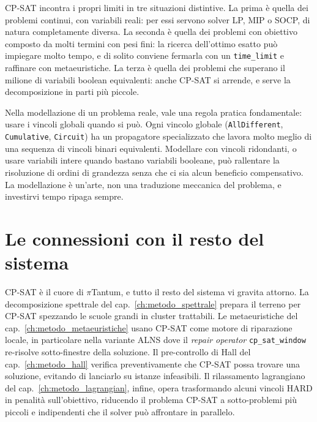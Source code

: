CP-SAT incontra i propri limiti in tre situazioni
distintive. La prima \`e quella dei problemi continui, con
variabili reali: per essi servono solver LP, MIP o SOCP, di
natura completamente diversa. La seconda \`e quella dei
problemi con obiettivo composto da molti termini con pesi
fini: la ricerca dell'ottimo esatto pu\`o impiegare molto
tempo, e di solito conviene fermarla con un \texttt{time\_limit}
e raffinare con metaeuristiche. La terza \`e quella dei
problemi che superano il milione di variabili boolean
equivalenti: anche CP-SAT si arrende, e serve la
decomposizione in parti pi\`u piccole.

\begin{avvertenzabox}
Nella modellazione di un problema reale, vale una regola
pratica fondamentale: usare i vincoli globali quando si pu\`o.
Ogni vincolo globale (\texttt{AllDifferent},
\texttt{Cumulative}, \texttt{Circuit}) ha un propagatore
specializzato che lavora molto meglio di una sequenza di
vincoli binari equivalenti. Modellare con vincoli ridondanti,
o usare variabili intere quando bastano variabili booleane,
pu\`o rallentare la risoluzione di ordini di grandezza
senza che ci sia alcun beneficio compensativo. La modellazione
\`e un'arte, non una traduzione meccanica del problema, e
investirvi tempo ripaga sempre.
\end{avvertenzabox}

\section{Le connessioni con il resto del sistema}

CP-SAT \`e il cuore di $\pi$Tantum, e tutto il resto del
sistema vi gravita attorno. La decomposizione spettrale del
cap.~\ref{ch:metodo_spettrale} prepara il terreno per CP-SAT
spezzando le scuole grandi in cluster trattabili. Le
metaeuristiche del cap.~\ref{ch:metodo_metaeuristiche} usano
CP-SAT come motore di riparazione locale, in particolare
nella variante ALNS dove il \emph{repair operator}
\texttt{cp\_sat\_window} re-risolve sotto-finestre della
soluzione. Il pre-controllo di Hall del
cap.~\ref{ch:metodo_hall} verifica preventivamente che
CP-SAT possa trovare una soluzione, evitando di lanciarlo su
istanze infeasibili. Il rilassamento lagrangiano del
cap.~\ref{ch:metodo_lagrangian}, infine, opera trasformando
alcuni vincoli HARD in penalit\`a sull'obiettivo, riducendo
il problema CP-SAT a sotto-problemi pi\`u piccoli e
indipendenti che il solver pu\`o affrontare in parallelo.

